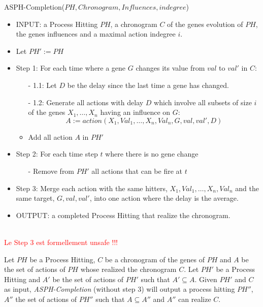\begin{algorithm}
	\caption{ASPH-Completion($PH,Chronogram,Influences,indegree$)}
	\label{alg:ASPHC}
	\begin{itemize}
		\item INPUT: a Process Hitting $PH$, a chronogram $C$ of the genes evolution of $PH$, the genes influences and a maximal action indegree $i$.

		\item Let $PH' := PH$
		\item Step 1: For each time where a gene $G$ changes its value from $val$ to $val'$ in $C$:

		\begin{itemize}
			\item[-] 1.1: Let $D$ be the delay since the last time a gene has changed.
			\item[-] 1.2: Generate all actions with delay $D$ which involve all subsets of size $i$ of the genes $X_1, \ldots, X_n$ having an influence on $G$:
			$$A := action(X_1,Val_1,\ldots, X_n,Val_n, G, val, val', D)$$
			\item Add all action $A$ in $PH'$
		\end{itemize}

		\item Step 2: For each time step $t$ where there is no gene change
		\begin{itemize}
			\item[-] Remove from $PH'$ all actions that can be fire at $t$
		\end{itemize}
		\item Step 3: Merge each action with the same hitters, $X_1,Val_1,\ldots, X_n,Val_n$ and the same target, $G, val, val'$, into one action where the delay is the average.
		\item OUTPUT:  a completed Process Hitting that realize the chronogram.
	\end{itemize}
	\textcolor{red}{\\Le Step 3 est formellement unsafe !!!}
\end{algorithm}

\begin{theorem}
	\label{th:correct}
	Let $PH$ be a Process Hitting, $C$ be a chronogram of the genes of $PH$ and $A$ be the set of actions of $PH$ whose realized the chronogram $C$.
	Let $PH'$ be a Process Hitting and $A'$ be the set of actions of $PH'$ such that $A' \subseteq A$.
	Given $PH'$ and $C$ as input, {\it ASPH-Completion} (without step 3) will output a process hitting $PH''$,
	$A''$ the set of actions of $PH''$ such that $A \subseteq A''$ and $A''$ can realize $C$.
\end{theorem}

